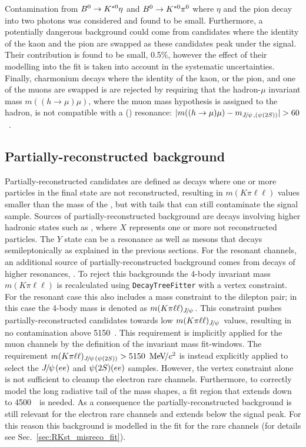 Contamination from $\Bz \to\Kstarz\eta$ and $\Bz \to\Kstarz\pi^0$ where $\eta$ and the pion decay into
two photons was considered and found to be small.
Furthermore, a potentially dangerous background could come from candidates where the
identity of the kaon and the pion are swapped as these candidates peak under the signal.
Their contribution is found to be small, 0.5\%, however the effect of their modelling into the fit
is taken into account in the systematic uncertainties.
Finally, charmonium decays where the identity of the kaon, or the pion, and one of the muons are swapped
is are rejected by requiring that the hadron-$\mu$ invariant
mass $m((h \to \mu)\mu)$, where the muon mass hypothesis is assigned to the hadron, is not compatible with
a \jpsi (\psitwos) resonance: $|m((h\to \mu)\mu)-m_{\jpsi, (\psitwos)} | > 60$~\mevcc.

\subsection{Partially-reconstructed background}
\label{sec:RKst_peaking_Dchains}

Partially-reconstructed candidates are defined as decays where one or more particles in the final state are not reconstructed,
resulting in $m(K\pi\ell\ell)$ values smaller than the mass of the \Bz, but with tails that can still contaminate the signal sample.
Sources of partially-reconstructed background are decays involving higher hadronic states such as 
, where $X$ represents one or more not reconstructed particles. 
The $Y$ state can be a \Kstar resonance as well as \D mesons that decays semileptonically as explained in the previous sections.
For the resonant channels, an additional source of partially-reconstructed 
background comes from decays of higher \ccbar resonances, .
%
To reject this backgrounds the 4-body invariant mass $m(K\pi\ell\ell)$ is recalculated using 
\verb!DecayTreeFitter! with a vertex constraint. For the resonant case this also includes a \jpsi mass constraint to the dilepton pair;
in this case the 4-body mass is denoted as $m(K\pi\ell\ell)_{\jpsi}$. This constraint pushes partially-reconstructed candidates towards 
low $m(K\pi\ell\ell)_{\jpsi}$ values, resulting in no contamination above 5150~\mevcc. This requirement is implicitly applied 
for the muon channels by the definition of the invariant mass fit-windows. 
The requirement $m(K\pi\ell\ell)_{\jpsi(\psitwos)} > 5150~\mevcc$ is instead explicitly applied to select 
the $\jpsi(ee)$ and $\psitwos(ee)$ samples.
However, the vertex constraint alone is not sufficient to cleanup the electron rare channels.
Furthermore, to correctly model the long radiative tail of the mass shapes, a fit region that extends 
down to 4500~\mevcc~is needed. As a consequence the partially-reconstructed background is still relevant
for the electron rare channels and extends below the signal peak. For this reason this background is modelled 
in the fit for the rare channels (for details see Sec.~\ref{sec:RKst_misreco_fit}).


